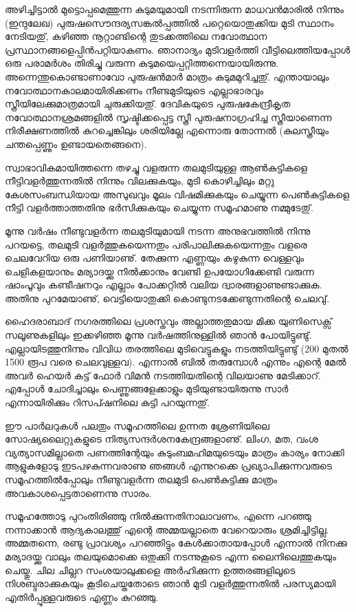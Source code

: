 അഴിച്ചിട്ടാല്‍ മുട്ടൊപ്പമെത്തുന്ന കുടുമയുമായി നടന്നിരുന്ന മാധവന്‍മാരില്‍ നിന്നും (ഇന്ദുലേഖ) 
പുരുഷസൌന്ദര്യസങ്കല്‍പ്പത്തില്‍ പറ്റെയൊതുക്കിയ മുടി സ്ഥാനം നേടിയതു്, കഴിഞ്ഞ നൂറ്റാണ്ടിന്റെ തുടക്കത്തിലെ 
നവോത്ഥാന പ്രസ്ഥാനങ്ങളെപ്പിന്‍പറ്റിയാകണം. ഞാനാദ്യം മുടിവളര്‍ത്തി വീട്ടിലെത്തിയപ്പോള്‍ ഒരു പരാമര്‍ശം തിരിച്ചു 
വരുന്ന കുടുമയെപ്പറ്റിത്തന്നെയായിരുന്നു. അന്നെന്തുകൊണ്ടാണാവോ പുരുഷന്‍മാര്‍ മാത്രം കുടുമമുറിച്ചതു്. എന്തായാലും 
നവോത്ഥാനകാലമായിരിക്കണം നീണ്ടമുടിയുടെ എല്ലാഭാരവും സ്ത്രീയിലേക്കുമാത്രമായി ചുരുക്കിയതു്.  ദേവികയുടെ 
പുരുഷകേന്ദ്രീകൃത നവോത്ഥാനശ്രമങ്ങളില്‍ സൃഷ്ടിക്കപ്പെട്ട സ്ത്രീ പുരുഷനാഗ്രഹിച്ച സ്ത്രീയാണെന്ന നിരീക്ഷണത്തില്‍ 
കുറച്ചെങ്കിലും ശരിയില്ലേ എന്നൊരു തോന്നല്‍ (കുലസ്ത്രീയും ചന്തപ്പെണ്ണും ഉണ്ടായതെങ്ങനെ).

സ്വാഭാവികമായിത്തന്നെ തഴച്ചു വളരുന്ന തലമുടിയുള്ള ആണ്‍കുട്ടികളെ നീട്ടിവളര്‍ത്തുന്നതില്‍ നിന്നും വിലക്കുകയും, മുടി 
കൊഴിച്ചിലും മറ്റു കേശസംബന്ധിയായ അസുഖവും മൂലം വിഷമിക്കുകയും ചെയ്യുന്ന പെണ്‍കുട്ടികളെ നീട്ടി വളര്‍ത്താത്തതിനു 
ഭര്‍സിക്കുകയും ചെയ്യുന്ന സമൂഹമാണു നമ്മുടേതു്.

മൂന്നു വര്‍ഷം നീണ്ടുവളര്‍ന്ന തലമുടിയുമായി നടന്ന അനുഭവത്തില്‍ നിന്നു പറയട്ടെ, തലമുടി വളര്‍ത്തുകയെന്നതും 
പരിപാലിക്കുകയെന്നതും വളരെ ചെലവേറിയ ഒരു പണിയാണു്. തേക്കുന്ന എണ്ണയും കഴുകുന്ന വെള്ളവും ചെളികളയാനും 
മര്യാദയ്ക്കു നില്‍ക്കാനും വേണ്ടി ഉപയോഗിക്കേണ്ടി വരുന്ന ഷാംപൂവും കണ്ടീഷനറും എല്ലാം പോക്കറ്റില്‍ വലിയ 
ദ്വാരങ്ങളാണുണ്ടാക്കുക. അതിനു പുറമേയാണു്, വെട്ടിയൊതുക്കി കൊണ്ടുനടക്കേണ്ടുന്നതിന്റെ ചെലവു്.

ഹൈദരാബാദ് നഗരത്തിലെ പ്രശസ്തവും അല്ലാത്തതുമായ മിക്ക യുണിസെക്സ് സലൂണുകളിലും ഇക്കഴിഞ്ഞ മൂന്നു 
വര്‍ഷത്തിനുള്ളില്‍ ഞാന്‍ പോയിട്ടുണ്ടു്. എല്ലായിടത്തുനിന്നും വിവിധ തരത്തിലെ മുടിവെട്ടുകളും നടത്തിയിട്ടുണ്ടു് (200 
‌മുതല്‍ 1500 രൂപ വരെ ചെലവുള്ളവ). എന്നാല്‍ ബില്‍ തരുമ്പോള്‍ എന്നും എന്റെ മേല്‍ അവര്‍ ഹെയര്‍ കട്ട് ഫോര്‍ 
വിമന്‍ നടത്തിയതിന്റെ വിലയാണു മേടിക്കാറ്. എപ്പോള്‍ ചോദിച്ചാലും പെണ്ണുങ്ങളേക്കാളും മുടിയുണ്ടായിരുന്നു സാര്‍ 
എന്നായിരിക്കും റിസപ്ഷനിലെ കുട്ടി പറയുന്നതു്.

ഈ പാര്‍ലറുകള്‍ പലതും സമൂഹത്തിലെ ഉന്നത ശ്രേണിയിലെ സോഷ്യലൈറ്റുകളുടെ നിത്യസന്ദര്‍ശനകേന്ദ്രങ്ങളാണു്. 
ലിംഗ, മത, വംശ വ്യത്യാസമില്ലാതെ പണത്തിന്റേയും കുടുംബമഹിമയുടെയും മാത്രം കാര്യം നോക്കി ആളുകളോടു 
ഇടപഴകുന്നവരാണു ഞങ്ങള്‍ എന്നുറക്കെ പ്രഖ്യാപിക്കുന്നവരുടെ സമൂഹത്തില്‍പ്പോലും നീണ്ടുവളര്‍ന്ന തലമുടി പെണ്‍കുട്ടിക്കു 
മാത്രം അവകാശപ്പെട്ടതാണെന്നു സാരം.

സമൂഹത്തോടു പുറംതിരിഞ്ഞു നില്‍ക്കുന്നതിനാലാവണം, എന്നെ പറഞ്ഞു നന്നാക്കാന്‍ ആദ്യകാലത്തു് എന്റെ 
അമ്മയല്ലാതെ വേറെയാരും ശ്രമിച്ചിട്ടില്ല. അമ്മതന്നെ, രണ്ടു പ്രാവശ്യം പറഞ്ഞിട്ടും കേള്‍ക്കാതായപ്പോള്‍ എന്നാല്‍ 
നിനക്കു മര്യാദയ്ക്കു വാലും തലയുമൊക്കെ ഒതുക്കി നടന്നുകൂടെ എന്ന ലൈനിലെത്തുകയും ചെയ്തു. ചില ചില്ലറ 
സംശയാലുക്കളെ അര്‍ഹിക്കുന്ന ഉത്തരങ്ങളിലൂടെ നിശബ്ദരാക്കുകയും കൂടിചെയ്തതോടെ ഞാന്‍ മുടി വളര്‍ത്തുന്നതില്‍ 
പരസ്യമായി എതിര്‍പ്പുള്ളവരുടെ എണ്ണം കുറഞ്ഞു.

